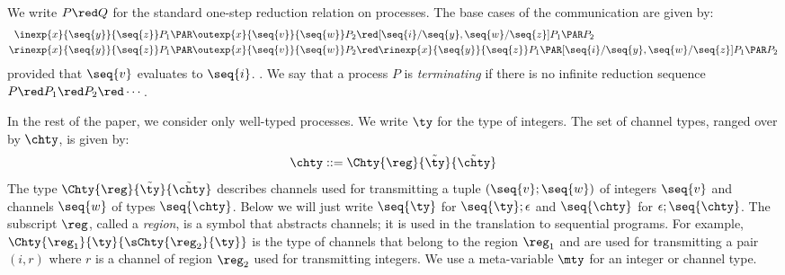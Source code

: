 We write \(P\red Q\) for the standard one-step reduction relation on processes.
The base cases of the communication are given by:
\begin{align*}
    \inexp{x}{\seq{y}}{\seq{z}}P_1 \PAR  \outexp{x}{\seq{v}}{\seq{w}}P_2 &\red [\seq{i}/ \seq{y}, \seq{w} / \seq{z} ]P_1 \PAR P_2 \\
    \rinexp{x}{\seq{y}}{\seq{z}}P_1 \PAR  \outexp{x}{\seq{v}}{\seq{w}}P_2 &\red \rinexp{x}{\seq{y}}{\seq{z}}P_1 \PAR [\seq{i}/ \seq{y}, \seq{w} / \seq{z}]P_1 \PAR P_2
\end{align*}
provided that \( \seq{v} \) evaluates to \( \seq{i} \).
.
We say that a process \(P\) is \emph{terminating} if there is no infinite
reduction sequence \(P\red P_1\red P_2\red \cdots\).

In the rest of the paper, we consider only well-typed processes.
We write \(\ty\) for the type of integers.
The set of channel types, ranged over by \(\chty\), is given by:
\begin{align*}
  \chty ::= \Chty{\reg}{\tilde{\ty}}{\tilde{\chty}}
\end{align*}
The type $\Chty{\reg}{\tilde{\ty}}{\tilde{\chty}}$
describes channels used for transmitting a tuple \((\seq{v};\seq{w})\)
of integers \(\seq{v}\) and channels \(\seq{w}\) of types \(\seq{\chty}\).
Below we will just write \( \seq{\ty} \) for \( \seq{\ty}; \epsilon \) and \( \seq{\chty} \) for \( \epsilon ;\seq{\chty}\).
The subscript \(\reg\), called a \emph{region}, is a symbol that
abstracts channels; it is used in the translation to sequential programs.
For example, \(\Chty{\reg_1}{\ty}{\sChty{\reg_2}{\ty}}\) is the type of channels
that belong to the region \(\reg_1\) and are
used for transmitting a pair \((i,r)\) where
\(r\) is a channel of region \(\reg_2\) used for transmitting integers.
We use a meta-variable \(\mty\) for an integer or channel type.

